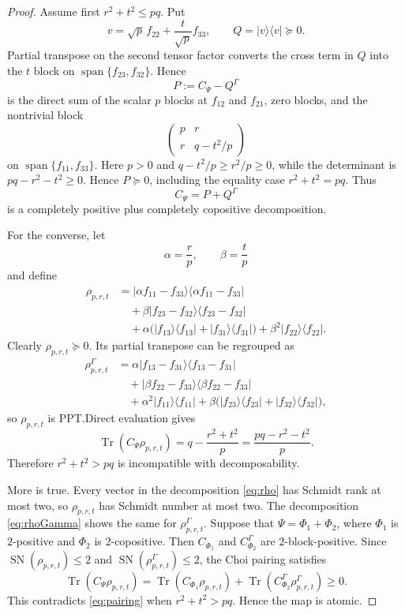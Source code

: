 \documentclass[11pt]{amsart}
\newcommand{\newrev}[1]{#1}
\newcommand{\Tr}{\operatorname{Tr}}
\newcommand{\SN}{\operatorname{SN}}
\newcommand{\Span}{\operatorname{span}}
\theoremstyle{plain}
\theoremstyle{definition}
\theoremstyle{remark}
\begin{document}
\begin{proof}
Assume first $r^2+t^2\le pq$. Put
\[
v=\sqrt p\,f_{22}+\frac t{\sqrt p}f_{33},
\qquad
Q=|v\rangle\langle v|\succeq0.
\]
Partial transpose on the second tensor factor converts the cross term in $Q$ into the $t$ block on $\Span\{f_{23},f_{32}\}$. Hence
\[
P:=C_\Psi-Q^\Gamma
\]
is the direct sum of the scalar $p$ blocks at $f_{12}$ and $f_{21}$, zero blocks, and the nontrivial block
\[
\begin{pmatrix}
p&r\\ r&q-t^2/p
\end{pmatrix}
\]
on $\Span\{f_{11},f_{33}\}$. {Here $p>0$ and $q-t^2/p\ge r^2/p\ge0$, while the determinant is $pq-r^2-t^2\ge0$. Hence $P\succeq0$, including the equality case $r^2+t^2=pq$.} Thus
\[
C_\Psi=P+Q^\Gamma
\]
is a completely positive plus completely copositive decomposition.

For the converse, let
\[
\alpha=\frac rp,\qquad \beta=\frac tp
\]
and define
\begin{align}
\rho_{p,r,t}
&=|\alpha f_{11}-f_{33}\rangle\langle\alpha f_{11}-f_{33}| \label{eq:rho}\\
&\quad+\beta|f_{23}-f_{32}\rangle\langle f_{23}-f_{32}|\nonumber\\
&\quad+\alpha\bigl(|f_{13}\rangle\langle f_{13}|+|f_{31}\rangle\langle f_{31}|\bigr)
+\beta^2|f_{22}\rangle\langle f_{22}|.\nonumber
\end{align}
Clearly $\rho_{p,r,t}\succeq0$. Its partial transpose can be regrouped as
\begin{align}
\rho_{p,r,t}^\Gamma
&=\alpha|f_{13}-f_{31}\rangle\langle f_{13}-f_{31}| \label{eq:rhoGamma}\\
&\quad+|\beta f_{22}-f_{33}\rangle\langle\beta f_{22}-f_{33}|\nonumber\\
&\quad+\alpha^2|f_{11}\rangle\langle f_{11}|
+\beta\bigl(|f_{23}\rangle\langle f_{23}|+|f_{32}\rangle\langle f_{32}|\bigr),\nonumber
\end{align}
so $\rho_{p,r,t}$ is PPT.\@ Direct evaluation gives
\begin{equation}\label{eq:pairing}
\Tr(C_\Psi\rho_{p,r,t})
=q-\frac{r^2+t^2}{p}
=\frac{pq-r^2-t^2}{p}.
\end{equation}
Therefore $r^2+t^2>pq$ is incompatible with decomposability.

More is true. Every vector in the decomposition \eqref{eq:rho} has Schmidt rank at most two, so $\rho_{p,r,t}$ has Schmidt number at most two. The decomposition \eqref{eq:rhoGamma} shows the same for $\rho_{p,r,t}^\Gamma$. \newrev{Suppose that $\Psi=\Phi_1+\Phi_2$, where $\Phi_1$ is $2$-positive and $\Phi_2$ is $2$-copositive. Then $C_{\Phi_1}$ and $C_{\Phi_2}^\Gamma$ are $2$-block-positive. Since $\SN(\rho_{p,r,t})\le2$ and $\SN(\rho_{p,r,t}^\Gamma)\le2$, the Choi pairing satisfies}
\[
\newrev{\Tr(C_\Psi\rho_{p,r,t})=\Tr(C_{\Phi_1}\rho_{p,r,t})+\Tr(C_{\Phi_2}^\Gamma\rho_{p,r,t}^\Gamma)\ge0.}
\]
\newrev{This contradicts \eqref{eq:pairing} when $r^2+t^2>pq$.} Hence the map is atomic.
\end{proof}
\end{document}
